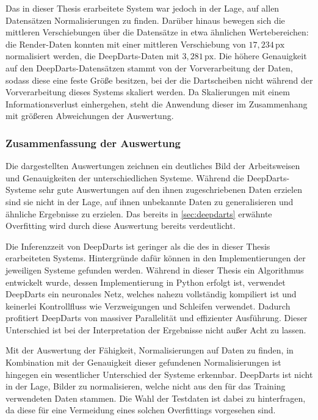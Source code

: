 Das in dieser Thesis erarbeitete System war jedoch in der Lage, auf allen Datensätzen Normalisierungen zu finden. Darüber hinaus bewegen sich die mittleren Verschiebungen über die Datensätze in etwa ähnlichen Wertebereichen: die Render-Daten konnten mit einer mittleren Verschiebung von $17,234\,\text{px}$ normalisiert werden, die DeepDarts-Daten mit $3,281\,\text{px}$. Die höhere Genauigkeit auf den DeepDarts-Datensätzen stammt von der Vorverarbeitung der Daten, sodass diese eine feste Größe besitzen, bei der die Dartscheiben nicht während der Vorverarbeitung dieses Systems skaliert werden. Da Skalierungen mit einem Informationsverlust einhergehen, steht die Anwendung dieser im Zusammenhang mit größeren Abweichungen der Auswertung.

\subsubsection{Zusammenfassung der Auswertung} %

Die dargestellten Auswertungen zeichnen ein deutliches Bild der Arbeitsweisen und Genauigkeiten der unterschiedlichen Systeme. Während die DeepDarts-Systeme sehr gute Auswertungen auf den ihnen zugeschriebenen Daten erzielen sind sie nicht in der Lage, auf ihnen unbekannte Daten zu generalisieren und ähnliche Ergebnisse zu erzielen. Das bereits in \autoref{sec:deepdarts} erwähnte Overfitting wird durch diese Auswertung bereits verdeutlicht.

Die Inferenzzeit von DeepDarts ist geringer als die des in dieser Thesis erarbeiteten Systems. Hintergründe dafür können in den Implementierungen der jeweiligen Systeme gefunden werden. Während in dieser Thesis ein Algorithmus entwickelt wurde, dessen Implementierung in Python erfolgt ist, verwendet DeepDarts ein neuronales Netz, welches nahezu vollständig kompiliert ist und keinerlei Kontrollfluss wie Verzweigungen und Schleifen verwendet. Dadurch profitiert DeepDarts von massiver Parallelität und effizienter Ausführung. Dieser Unterschied ist bei der Interpretation der Ergebnisse nicht außer Acht zu lassen.

Mit der Auswertung der Fähigkeit, Normalisierungen auf Daten zu finden, in Kombination mit der Genauigkeit dieser gefundenen Normalisierungen ist hingegen ein wesentlicher Unterschied der Systeme erkennbar. DeepDarts ist nicht in der Lage, Bilder zu normalisieren, welche nicht aus den für das Training verwendeten Daten stammen. Die Wahl der Testdaten ist dabei zu hinterfragen, da diese für eine Vermeidung eines solchen Overfittings vorgesehen sind.
